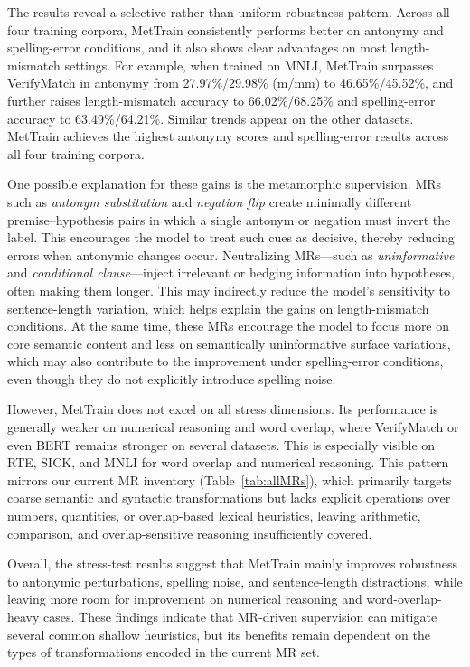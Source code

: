 \documentclass[lettersize,journal]{IEEEtran}
\begin{document}
The results reveal a selective rather than uniform robustness pattern. Across all four training corpora, MetTrain consistently performs better on antonymy and spelling-error conditions, and it also shows clear advantages on most length-mismatch settings. For example, when trained on MNLI, MetTrain surpasses  VerifyMatch in antonymy from 27.97\%/29.98\% (m/mm) to 46.65\%/45.52\%, and further raises length-mismatch accuracy to 66.02\%/68.25\% and spelling-error accuracy to 63.49\%/64.21\%. Similar trends appear on the other datasets. MetTrain achieves the highest antonymy scores and spelling-error results across all four training corpora.

One possible explanation for these gains is the metamorphic supervision. MRs such as \textit{antonym substitution} and \textit{negation flip} create minimally different premise--hypothesis pairs in which a single antonym or negation must invert the label. This encourages the model to treat such cues as decisive, thereby reducing errors when antonymic changes occur. Neutralizing MRs---such as \textit{uninformative} and \textit{conditional clause}---inject irrelevant or hedging information into hypotheses, often making them longer. This may indirectly reduce the model's sensitivity to sentence-length variation, which helps explain the gains on length-mismatch conditions. At the same time, these MRs encourage the model to focus more on core semantic content and less on semantically uninformative surface variations, which may also contribute to the improvement under spelling-error conditions, even though they do not explicitly introduce spelling noise.

However, MetTrain does not excel on all stress dimensions. Its performance is generally weaker on numerical reasoning and word overlap, where VerifyMatch or even BERT remains stronger on several datasets. This is especially visible on RTE, SICK, and MNLI for word overlap and numerical reasoning. This pattern mirrors our current MR inventory (Table~\ref{tab:allMRs}), which primarily targets coarse semantic and syntactic transformations but lacks explicit operations over numbers, quantities, or overlap-based lexical heuristics, leaving arithmetic, comparison, and overlap-sensitive reasoning insufficiently covered.

Overall, the stress-test results suggest that MetTrain mainly improves robustness to antonymic perturbations, spelling noise, and sentence-length distractions, while leaving more room for improvement on numerical reasoning and word-overlap-heavy cases. These findings indicate that MR-driven supervision can mitigate several common shallow heuristics, but its benefits remain dependent on the types of transformations encoded in the current MR set.
\end{document}
